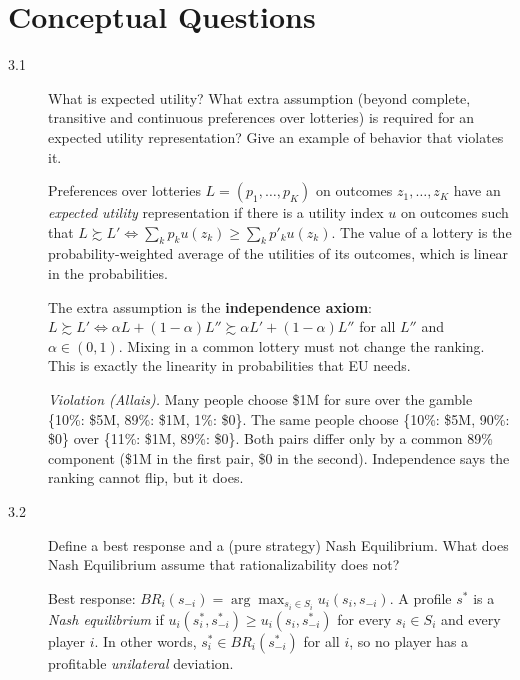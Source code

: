 \section{Conceptual Questions}

\begin{description}
\item[3.1] What is expected utility? What extra assumption (beyond complete, transitive and continuous preferences over lotteries) is required for an expected utility representation? Give an example of behavior that violates it.
\begin{solution}
Preferences over lotteries $L=(p_1,\dots,p_K)$ on outcomes $z_1,\dots,z_K$ have an \emph{expected utility} representation if there is a utility index $u$ on outcomes such that $L\succsim L'\iff\sum_k p_k u(z_k)\ge\sum_k p'_k u(z_k)$. The value of a lottery is the probability-weighted average of the utilities of its outcomes, which is linear in the probabilities.

The extra assumption is the \textbf{independence axiom}: $L\succsim L'\iff\alpha L+(1-\alpha)L''\succsim\alpha L'+(1-\alpha)L''$ for all $L''$ and $\alpha\in(0,1)$. Mixing in a common lottery must not change the ranking. This is exactly the linearity in probabilities that EU needs.

\emph{Violation (Allais).} Many people choose \$1M for sure over the gamble \{10\%: \$5M, 89\%: \$1M, 1\%: \$0\}. The same people choose \{10\%: \$5M, 90\%: \$0\} over \{11\%: \$1M, 89\%: \$0\}. Both pairs differ only by a common 89\% component (\$1M in the first pair, \$0 in the second). Independence says the ranking cannot flip, but it does.
\end{solution}
\item[3.2] Define a best response and a (pure strategy) Nash Equilibrium. What does Nash Equilibrium assume that rationalizability does not?
\begin{solution}
Best response: $BR_i(s_{-i})=\arg\max_{s_i\in S_i}u_i(s_i,s_{-i})$.
A profile $s^*$ is a \emph{Nash equilibrium} if $u_i(s_i^*,s_{-i}^*)\ge u_i(s_i,s_{-i}^*)$ for every $s_i\in S_i$ and every player $i$. In other words, $s_i^*\in BR_i(s_{-i}^*)$ for all $i$, so no player has a profitable \emph{unilateral} deviation.


\end{solution}
\end{description}
